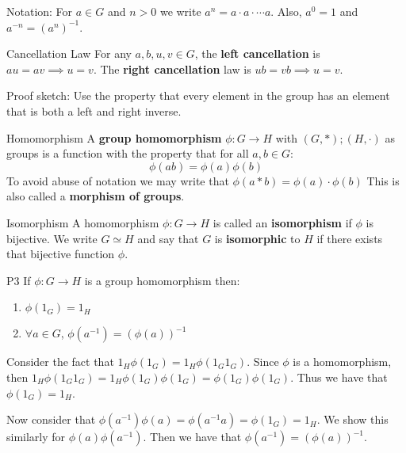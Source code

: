 \documentclass{article}
\begin{document}
Notation: For $a \in G$ and $n > 0$ we write $a^n = a\cdot a \cdot \cdots a$. Also, $a^0 = 1$ and $a^{-n} = \left( a^{n} \right)^{-1}$. 

\begin{cprop}{Cancellation Law}{}
    For any $a,b,u,v \in G$, the \textbf{left cancellation} is $au = av \implies u = v$. The \textbf{right cancellation} law is $ub = vb \implies u = v$.

    Proof sketch: Use the property that every element in the group has an element that is both a left and right inverse.
\end{cprop}


\begin{cdef}{Homomorphism}{}
    A \textbf{group homomorphism} $\phi : G \to H$ with $(G,*); (H, \cdot)$ as groups is a function with the property that for all $a,b \in G$:
    \[
        \phi(ab) = \phi(a) \phi(b)
    \]
    To avoid abuse of notation we may write that $\phi(a * b) = \phi(a) \cdot \phi(b)$
    This is also called a \textbf{morphism of groups}. 
\end{cdef}

\begin{cdef}{Isomorphism}{}
    A homomorphism $\phi: G \to H$ is called an \textbf{isomorphism} if $\phi$ is bijective. We write $G \simeq H$ and say that $G$ is \textbf{isomorphic} to $H$ if there exists that bijective function $\phi$. 
\end{cdef}

\begin{cprop}{P3}{}
    If $\phi: G\to H$ is a group homomorphism then:
    \begin{enumerate}
        \item $\phi(1_G) = 1_H$
        \item $\forall a \in G$, $\phi(a^{-1}) = \left( \phi(a) \right)^{-1}$
    \end{enumerate}

    \begin{cpf}
       Consider the fact that $1_H \phi(1_G) = 1_H \phi(1_G 1_G)$. Since $\phi$ is a homomorphism, then $1_H \phi(1_G 1_G) = 1_H \phi(1_G)\phi(1_G) = \phi(1_G)\phi(1_G)$. Thus we have that $\phi(1_G) = 1_H$. 

       Now consider that $\phi(a^{-1})\phi(a) = \phi(a^{-1}a) = \phi(1_G) = 1_H$. We show this similarly for $\phi(a)\phi(a^{-1})$. Then we have that $\phi(a^{-1}) = \left( \phi(a) \right)^{-1}$. 
    \end{cpf}
    
\end{cprop}
\end{document}
